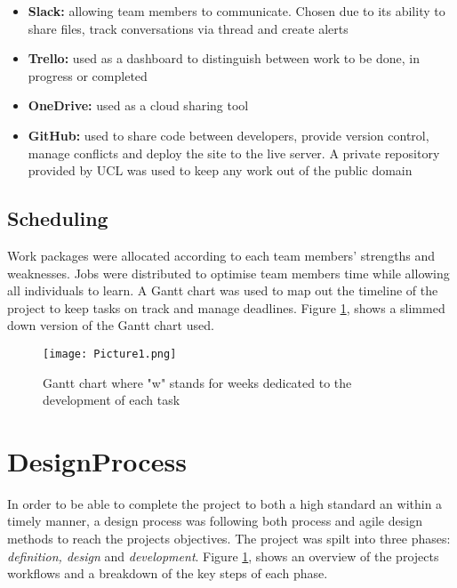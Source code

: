 \begin{itemize}
\tightlist
\item
  \textbf{Slack:} allowing team members to communicate. Chosen due to
  its ability to share files, track conversations via thread and create
  alerts
\item
  \textbf{Trello:} used as a dashboard to distinguish between work to be
  done, in progress or completed
\item
  \textbf{OneDrive:} used as a cloud sharing tool
\item
  \textbf{GitHub:} used to share code between developers, provide
  version control, manage conflicts and deploy the site to the live
  server. A private repository provided by UCL was used to keep any work
  out of the public domain
\end{itemize}

\hypertarget{scheduling}{%
\subsection{Scheduling}\label{scheduling}}

Work packages were allocated according to each team members' strengths
and weaknesses. Jobs were distributed to optimise team members time
while allowing all individuals to learn. A Gantt chart was used to map
out the timeline of the project to keep tasks on track and manage
deadlines. Figure \ref{gantt}, shows a slimmed down version of the Gantt
chart used.

\begin{landscape}
\begin{figure}[H]
      \centering
      \texttt{[image: Picture1.png]}
      \caption{Gantt chart where "w" stands for weeks dedicated to the development of each task}
\label{gantt}
 \end{figure}
 \end{landscape}

\newpage

\hypertarget{designprocess}{%
\section{DesignProcess}\label{designprocess}}

In order to be able to complete the project to both a high standard an
within a timely manner, a design process was following both process and
agile design methods to reach the projects objectives. The project was
spilt into three phases: \emph{definition, design} and
\emph{development}. Figure \ref{designprocess}, shows an overview of the
projects workflows and a breakdown of the key steps of each phase.

